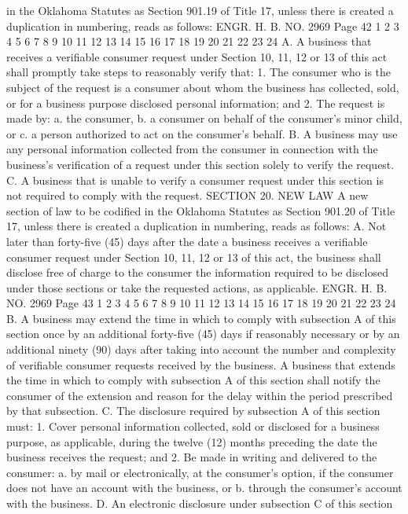 in the Oklahoma Statutes as Section 901.19 of Title 17, unless there
is created a duplication in numbering, reads as follows:
ENGR. H. B. NO. 2969 Page 42
1
2
3
4
5
6
7
8
9
10
11
12
13
14
15
16
17
18
19
20
21
22
23
24
A. A business that receives a verifiable consumer request under
Section 10, 11, 12 or 13 of this act shall promptly take steps to
reasonably verify that:
1. The consumer who is the subject of the request is a consumer
about whom the business has collected, sold, or for a business
purpose disclosed personal information; and
2. The request is made by:
a. the consumer,
b. a consumer on behalf of the consumer's minor child, or
c. a person authorized to act on the consumer's behalf.
B. A business may use any personal information collected from
the consumer in connection with the business's verification of a
request under this section solely to verify the request.
C. A business that is unable to verify a consumer request under
this section is not required to comply with the request.
SECTION 20. NEW LAW A new section of law to be codified
in the Oklahoma Statutes as Section 901.20 of Title 17, unless there
is created a duplication in numbering, reads as follows:
A. Not later than forty-five (45) days after the date a
business receives a verifiable consumer request under Section 10,
11, 12 or 13 of this act, the business shall disclose free of charge
to the consumer the information required to be disclosed under those
sections or take the requested actions, as applicable.
ENGR. H. B. NO. 2969 Page 43
1
2
3
4
5
6
7
8
9
10
11
12
13
14
15
16
17
18
19
20
21
22
23
24
B. A business may extend the time in which to comply with
subsection A of this section once by an additional forty-five (45)
days if reasonably necessary or by an additional ninety (90) days
after taking into account the number and complexity of verifiable
consumer requests received by the business. A business that extends
the time in which to comply with subsection A of this section shall
notify the consumer of the extension and reason for the delay within
the period prescribed by that subsection.
C. The disclosure required by subsection A of this section
must:
1. Cover personal information collected, sold or disclosed for
a business purpose, as applicable, during the twelve (12) months
preceding the date the business receives the request; and
2. Be made in writing and delivered to the consumer:
a. by mail or electronically, at the consumer's option,
if the consumer does not have an account with the
business, or
b. through the consumer's account with the business.
D. An electronic disclosure under subsection C of this section
